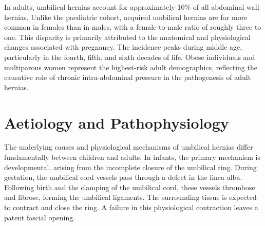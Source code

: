 In adults, umbilical hernias account for approximately 10\% of all abdominal wall hernias. Unlike the paediatric cohort, acquired umbilical hernias are far more common in females than in males, with a female-to-male ratio of roughly three to one. This disparity is primarily attributed to the anatomical and physiological changes associated with pregnancy. The incidence peaks during middle age, particularly in the fourth, fifth, and sixth decades of life. Obese individuals and multiparous women represent the highest-risk adult demographics, reflecting the causative role of chronic intra-abdominal pressure in the pathogenesis of adult hernias.

\section*{Aetiology and Pathophysiology}
The underlying causes and physiological mechanisms of umbilical hernias differ fundamentally between children and adults. In infants, the primary mechanism is developmental, arising from the incomplete closure of the umbilical ring. During gestation, the umbilical cord vessels pass through a defect in the linea alba. Following birth and the clamping of the umbilical cord, these vessels thrombose and fibrose, forming the umbilical ligaments. The surrounding tissue is expected to contract and close the ring. A failure in this physiological contraction leaves a patent fascial opening.

